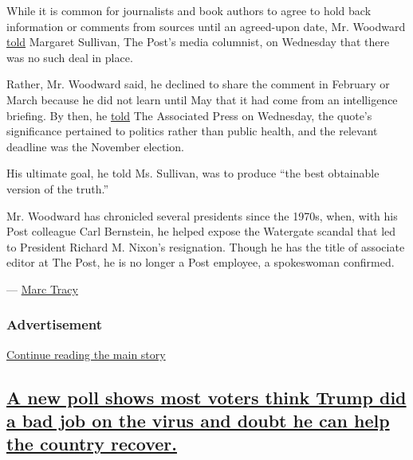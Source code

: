 While it is common for journalists and book authors to agree to hold
back information or comments from sources until an agreed-upon date, Mr.
Woodward
\href{https://www.washingtonpost.com/lifestyle/media/should-bob-woodward-have-reported-trumps-virus-revelations-sooner-heres-how-he-defends-his-decision/2020/09/09/6bd7fc32-f2d1-11ea-b796-2dd09962649c_story.html}{told}
Margaret Sullivan, The Post's media columnist, on Wednesday that there
was no such deal in place.

Rather, Mr. Woodward said, he declined to share the comment in February
or March because he did not learn until May that it had come from an
intelligence briefing. By then, he
\href{https://apnews.com/99916044401d8f8e24eb7bedfec1d5d2}{told} The
Associated Press on Wednesday, the quote's significance pertained to
politics rather than public health, and the relevant deadline was the
November election.

His ultimate goal, he told Ms. Sullivan, was to produce ``the best
obtainable version of the truth.''

Mr. Woodward has chronicled several presidents since the 1970s, when,
with his Post colleague Carl Bernstein, he helped expose the Watergate
scandal that led to President Richard M. Nixon's resignation. Though he
has the title of associate editor at The Post, he is no longer a Post
employee, a spokeswoman confirmed.

--- \href{https://www.nytimes3xbfgragh.onion/by/marc-tracy}{Marc Tracy}

\hypertarget{advertisement-1}{%
\subsubsection{Advertisement}\label{advertisement-1}}

\protect\hyperlink{after-dfp-ad-mid2}{Continue reading the main story}

\hypertarget{a-new-poll-shows-most-voters-think-trump-did-a-bad-job-on-the-virus-and-doubt-he-can-help-the-country-recover}{%
\subsection{\texorpdfstring{\protect\hyperlink{a-new-poll-shows-most-voters-think-trump-did-a-bad-job-on-the-virus-and-doubt-he-can-help-the-country-recover}{A
new poll shows most voters think Trump did a bad job on the virus and
doubt he can help the country
recover.}}{A new poll shows most voters think Trump did a bad job on the virus and doubt he can help the country recover.}}\label{a-new-poll-shows-most-voters-think-trump-did-a-bad-job-on-the-virus-and-doubt-he-can-help-the-country-recover}}

